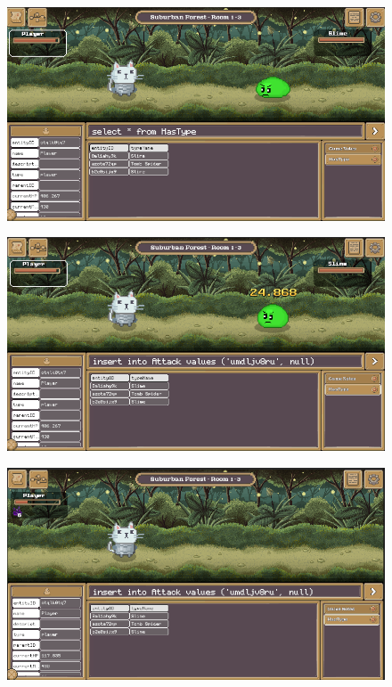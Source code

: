\begin{figure}[H]
	\centering
	\includegraphics[width=13cm]{Images/gameplay6.png}
	\vspace{0.5cm}
	\caption{}
\end{figure}

\begin{figure}[H]
	\centering
	\includegraphics[width=13cm]{Images/gameplay7.png}
	\vspace{0.5cm}
	\caption{}
\end{figure}

\begin{figure}[H]
	\centering
	\includegraphics[width=13cm]{Images/gameplay8.png}
	\vspace{0.5cm}
	\caption{}
\end{figure}


